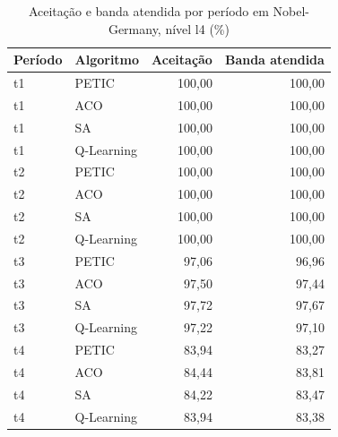 \begin{table}[htb]
    \centering
    \scriptsize
    \caption{Aceitação e banda atendida por período em Nobel-Germany, nível l4 (\%)}
    \label{tab:periodos-nobel-germany-l4}
    \begin{tabular}{llrr}
        \hline
        Período & Algoritmo & Aceitação & Banda atendida \\
        \hline
        t1 & PETIC & 100,00 & 100,00 \\
        t1 & ACO & 100,00 & 100,00 \\
        t1 & SA & 100,00 & 100,00 \\
        t1 & Q-Learning & 100,00 & 100,00 \\
        t2 & PETIC & 100,00 & 100,00 \\
        t2 & ACO & 100,00 & 100,00 \\
        t2 & SA & 100,00 & 100,00 \\
        t2 & Q-Learning & 100,00 & 100,00 \\
        t3 & PETIC & 97,06 & 96,96 \\
        t3 & ACO & 97,50 & 97,44 \\
        t3 & SA & 97,72 & 97,67 \\
        t3 & Q-Learning & 97,22 & 97,10 \\
        t4 & PETIC & 83,94 & 83,27 \\
        t4 & ACO & 84,44 & 83,81 \\
        t4 & SA & 84,22 & 83,47 \\
        t4 & Q-Learning & 83,94 & 83,38 \\
        \hline
    \end{tabular}
\end{table}

